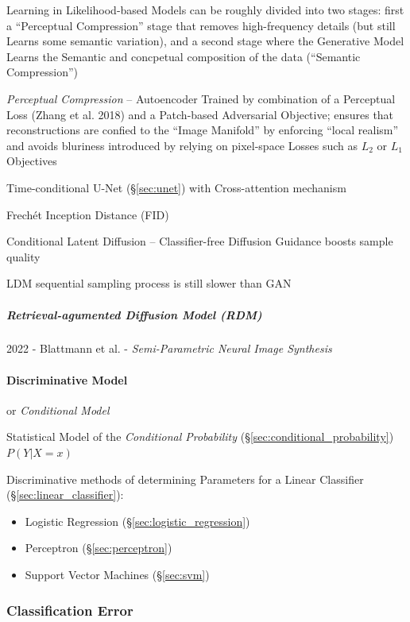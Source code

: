 Learning in Likelihood-based Models can be roughly divided into two stages:
first a ``Perceptual Compression'' stage that removes high-frequency details
(but still Learns some semantic variation), and a second stage where the
Generative Model Learns the Semantic and concpetual composition of the data
(``Semantic Compression'')

\emph{Perceptual Compression} -- Autoencoder Trained by combination of a
Perceptual Loss (Zhang et al. 2018) and a Patch-based Adversarial Objective;
ensures that reconstructions are confied to the ``Image Manifold'' by enforcing
``local realism'' and avoids bluriness introduced by relying on pixel-space
Losses such as $L_2$ or $L_1$ Objectives

Time-conditional U-Net (\S\ref{sec:unet}) with Cross-attention mechanism

Frech\'et Inception Distance (FID)

Conditional Latent Diffusion -- Classifier-free Diffusion Guidance boosts sample
quality

LDM sequential sampling process is still slower than GAN



\subparagraph{Retrieval-agumented Diffusion Model (RDM)}\label{sec:rdm}\hfill

2022 - Blattmann et al. - \emph{Semi-Parametric Neural Image Synthesis}



\paragraph{Discriminative Model}\label{sec:discriminative_model}\hfill

or \emph{Conditional Model}

Statistical Model of the \emph{Conditional Probability}
(\S\ref{sec:conditional_probability}) $P(Y | X = x)$

Discriminative methods of determining Parameters for a Linear Classifier
(\S\ref{sec:linear_classifier}):
\begin{itemize}
  \item Logistic Regression (\S\ref{sec:logistic_regression})
  \item Perceptron (\S\ref{sec:perceptron})
  \item Support Vector Machines (\S\ref{sec:svm})
\end{itemize}



\subsubsection{Classification Error}\label{sec:classification_error}

